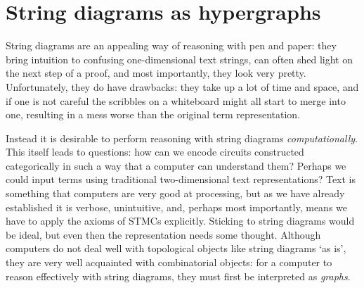 \chapter{String diagrams as hypergraphs}

String diagrams are an appealing way of reasoning with pen and paper: they bring
intuition to confusing one-dimensional text strings, can often shed light on the
next step of a proof, and most importantly, they look very pretty.
Unfortunately, they do have drawbacks: they take up a lot of time and space, and
if one is not careful the scribbles on a whiteboard might all start to merge
into one, resulting in a mess worse than the original term representation.

Instead it is desirable to perform reasoning with string diagrams
\emph{computationally}.
This itself leads to questions: how can we encode circuits constructed
categorically in such a way that a computer can understand them?
Perhaps we could input terms using traditional two-dimensional text
representations?
Text is something that computers are very good at processing, but as we have
already established it is verbose, unintuitive, and, perhaps most importantly,
means we have to apply the axioms of STMCs explicitly.
Sticking to string diagrams would be ideal, but even then the representation
needs some thought.
Although computers do not deal well with topological objects like string
diagrams `as is', they are very well acquainted with combinatorial objects: for
a computer to reason effectively with string diagrams, they must first be
interpreted as \emph{graphs}.








